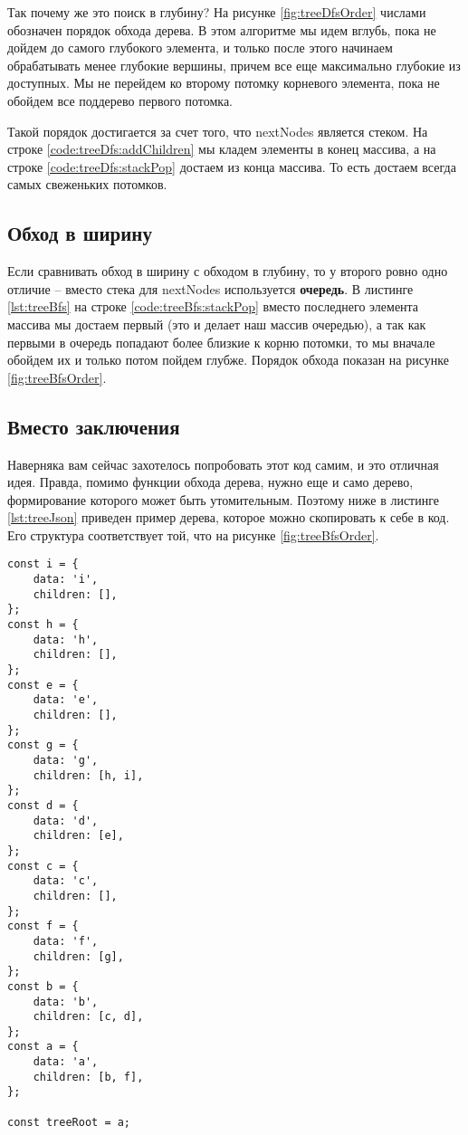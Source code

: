 \documentclass[../../article]{subfiles}
\begin{document}
Так почему же это поиск в глубину? На рисунке \ref{fig:treeDfsOrder} числами обозначен порядок обхода дерева. В этом алгоритме мы идем вглубь, пока не дойдем до самого глубокого элемента, и только после этого начинаем обрабатывать менее глубокие вершины, причем все еще максимально глубокие из доступных. Мы не перейдем ко второму потомку корневого элемента, пока не обойдем все поддерево первого потомка.

Такой порядок достигается за счет того, что {\firacodebold nextNodes} является стеком. На строке \ref{code:treeDfs:addChildren} мы кладем элементы в конец массива, а на строке \ref{code:treeDfs:stackPop} достаем из конца массива. То есть достаем всегда самых свеженьких потомков.

\subsection{Обход в ширину}

Если сравнивать обход в ширину с обходом в глубину, то у второго ровно одно отличие – вместо стека для {\firacodebold nextNodes} используется {\bfseries очередь}. В листинге \ref{lst:treeBfs} на строке \ref{code:treeBfs:stackPop} вместо последнего элемента массива мы достаем первый (это и делает наш массив очередью), а так как первыми в очередь попадают более близкие к корню потомки, то мы вначале обойдем их и только потом пойдем глубже. Порядок обхода показан на рисунке \ref{fig:treeBfsOrder}.

\subsection{Вместо заключения}
Наверняка вам сейчас захотелось попробовать этот код самим, и это отличная идея. Правда, помимо функции обхода дерева, нужно еще и само дерево, формирование которого может быть утомительным. Поэтому ниже в листинге \ref{lst:treeJson} приведен пример дерева, которое можно скопировать к себе в код. Его структура соответствует той, что на рисунке \ref{fig:treeBfsOrder}.

\begin{ruledelement}
    \begin{lstlisting}[caption={Пример {\firacodebold treeRoot}}, label={lst:treeJson}]
const i = {
    data: 'i',
    children: [],
};
const h = {
    data: 'h',
    children: [],
};
const e = {
    data: 'e',
    children: [],
};
const g = {
    data: 'g',
    children: [h, i],
};
const d = {
    data: 'd',
    children: [e],
};
const c = {
    data: 'c',
    children: [],
};
const f = {
    data: 'f',
    children: [g],
};
const b = {
    data: 'b',
    children: [c, d],
};
const a = {
    data: 'a',
    children: [b, f],
};

const treeRoot = a;
    \end{lstlisting}
\end{ruledelement}
\end{document}

